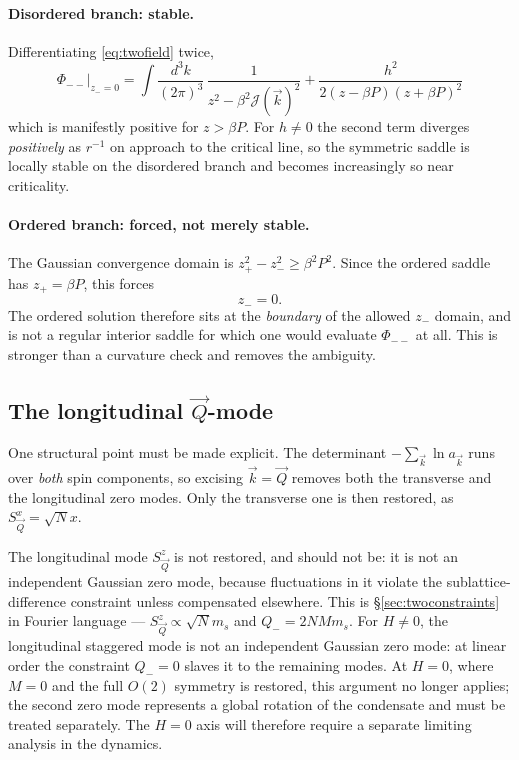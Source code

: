 \documentclass[11pt,a4paper]{article}
\newcommand{\Jc}{\mathcal{J}}
\newcommand{\bk}{\vec k}
\newcommand{\bQ}{\vec Q}
\newcommand{\dk}{\frac{d^3k}{(2\pi)^3}}
\newcommand{\Jc}{\mathcal{J}}
\newcommand{\bk}{\vec k}
\newcommand{\bQ}{\vec Q}
\newcommand{\dk}{\frac{d^3k}{(2\pi)^3}}
\begin{document}
\paragraph{Disordered branch: stable.} Differentiating \eqref{eq:twofield} twice,
\begin{equation}
  \boxed{\ \Phi_{--}\big|_{z_-=0}
   =\int\!\dk\,\frac{1}{z^2-\beta^2\Jc(\bk)^2}
   +\frac{h^2}{2(z-\beta P)(z+\beta P)^2}\ }
\end{equation}
which is manifestly positive for $z>\beta P$. For $h\neq0$ the second term diverges
\emph{positively} as $r^{-1}$ on approach to the critical line, so the symmetric saddle is
locally stable on the disordered branch and becomes increasingly so near criticality.

\paragraph{Ordered branch: forced, not merely stable.} The Gaussian convergence domain is
$z_+^2-z_-^2\geq\beta^2P^2$. Since the ordered saddle has $z_+=\beta P$, this forces
\begin{equation}
  z_-=0 .
\end{equation}
The ordered solution therefore sits at the \emph{boundary} of the allowed $z_-$ domain, and
is not a regular interior saddle for which one would evaluate $\Phi_{--}$ at all. This is
stronger than a curvature check and removes the ambiguity.

\subsection{The longitudinal $\bQ$-mode}
\label{sec:qmode}
One structural point must be made explicit. The determinant $-\sum_{\bk}\ln a_{\bk}$ runs
over \emph{both} spin components, so excising $\bk=\bQ$  removes both
the transverse and the longitudinal zero modes. Only the transverse one is then restored, as
$S^x_{\bQ}=\sqrt N x$.

The longitudinal mode $S^z_{\bQ}$ is not restored, and should not be: it is not an
independent Gaussian zero mode, because fluctuations in it violate the sublattice-difference
constraint unless compensated elsewhere. This is \S\ref{sec:twoconstraints} in Fourier
language --- $S^z_{\bQ}\propto\sqrt N m_s$ and $Q_-=2NMm_s$.
For $H\neq 0$, the longitudinal staggered mode is not an independent Gaussian zero mode: at linear order the constraint $Q_-=0$ slaves it to the remaining modes. At $H=0$, where $M=0$ and the full $O(2)$ symmetry is restored, this argument no longer applies; the second zero mode represents a global rotation of the condensate and must be treated separately. The $H=0$ axis will therefore require a separate limiting analysis in the dynamics.
\end{document}
